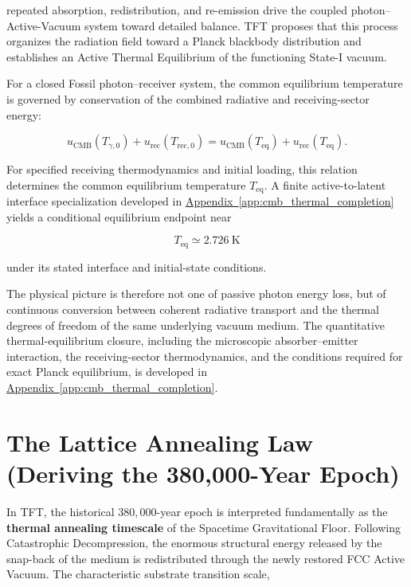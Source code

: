 repeated absorption, redistribution, and re-emission drive the coupled photon--Active-Vacuum system toward detailed balance. TFT proposes that this process organizes the radiation field toward a Planck blackbody distribution and establishes an Active Thermal Equilibrium of the functioning State-I vacuum.

For a closed Fossil photon--receiver system, the common equilibrium temperature is governed by conservation of the combined radiative and receiving-sector energy:

\begin{equation}
    {
    u_{\mathrm{CMB}}(T_{\gamma,0})
    +
    u_{\mathrm{rec}}(T_{\mathrm{rec},0})
    =
    u_{\mathrm{CMB}}(T_{\mathrm{eq}})
    +
    u_{\mathrm{rec}}(T_{\mathrm{eq}}).
    }
\end{equation}

For specified receiving thermodynamics and initial loading, this relation determines the common equilibrium temperature $T_{\mathrm{eq}}$. A finite active-to-latent interface specialization developed in \hyperref[app:cmb_thermal_completion]{Appendix~\ref*{app:cmb_thermal_completion}} yields a conditional equilibrium endpoint near

\begin{equation}
    T_{\mathrm{eq}}
    \simeq
    2.726\ \mathrm{K}
\end{equation}

under its stated interface and initial-state conditions.

The physical picture is therefore not one of passive photon energy loss, but of continuous conversion between coherent radiative transport and the thermal degrees of freedom of the same underlying vacuum medium. The quantitative thermal-equilibrium closure, including the microscopic absorber--emitter interaction, the receiving-sector thermodynamics, and the conditions required for exact Planck equilibrium, is developed in \hyperref[app:cmb_thermal_completion]{Appendix~\ref*{app:cmb_thermal_completion}}.

\section{The Lattice Annealing Law (Deriving the 380,000-Year Epoch)}
\label{sec:lattice_annealing_law}

In TFT, the historical \(380{,}000\)-year epoch is interpreted fundamentally as the \textbf{thermal annealing timescale} of the Spacetime Gravitational Floor. Following Catastrophic Decompression, the enormous structural energy released by the snap-back of the medium is redistributed through the newly restored FCC Active Vacuum. The characteristic substrate transition scale,

